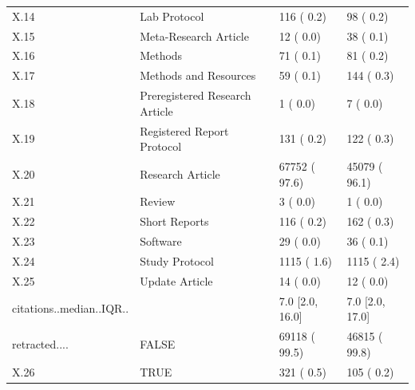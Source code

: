 \begin{table}[ht]
\begin{tabular}{llll}
  X.14 & Lab Protocol &    116 (  0.2)  &     98 (  0.2)  \\ 
  X.15 & Meta-Research Article &     12 (  0.0)  &     38 (  0.1)  \\ 
  X.16 & Methods &     71 (  0.1)  &     81 (  0.2)  \\ 
  X.17 & Methods and Resources &     59 (  0.1)  &    144 (  0.3)  \\ 
  X.18 & Preregistered Research Article &      1 (  0.0)  &      7 (  0.0)  \\ 
  X.19 & Registered Report Protocol &    131 (  0.2)  &    122 (  0.3)  \\ 
  X.20 & Research Article &  67752 ( 97.6)  &  45079 ( 96.1)  \\ 
  X.21 & Review &      3 (  0.0)  &      1 (  0.0)  \\ 
  X.22 & Short Reports &    116 (  0.2)  &    162 (  0.3)  \\ 
  X.23 & Software &     29 (  0.0)  &     36 (  0.1)  \\ 
  X.24 & Study Protocol &   1115 (  1.6)  &   1115 (  2.4)  \\ 
  X.25 & Update Article &     14 (  0.0)  &     12 (  0.0)  \\ 
  citations..median..IQR.. &  &    7.0 [2.0, 16.0] &    7.0 [2.0, 17.0] \\ 
  retracted.... & FALSE &  69118 ( 99.5)  &  46815 ( 99.8)  \\ 
  X.26 & TRUE &    321 (  0.5)  &    105 (  0.2)  \\ 
  \end{tabular}
\end{table}
